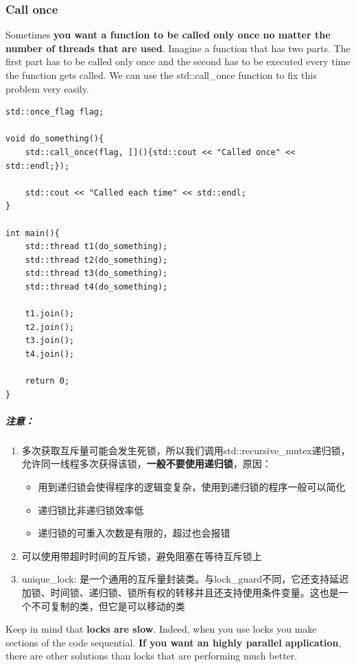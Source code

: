 \documentclass[UTF8,a4paper,12pt]{ctexbook}
\begin{document}
	\subsubsection{Call once}
		Sometimes \textbf{you want a function to be called only once no matter the number of threads that are used}. Imagine a function that has two parts. The first part has to be called only once and the second has to be executed every time the function gets called. We can use the std::call\_once function to fix this problem very easily.
		
		\begin{lstlisting}
std::once_flag flag;

void do_something(){
	std::call_once(flag, [](){std::cout << "Called once" << std::endl;});
	
	std::cout << "Called each time" << std::endl;
}

int main(){
	std::thread t1(do_something);
	std::thread t2(do_something);
	std::thread t3(do_something);
	std::thread t4(do_something);
	
	t1.join();
	t2.join();
	t3.join();
	t4.join();
	
	return 0;
}			
		\end{lstlisting}
	\subparagraph{注意：}
		\begin{enumerate}[itemindent = 1em]
			\item 多次获取互斥量可能会发生死锁，所以我们调用std::recursive\_mutex递归锁，允许同一线程多次获得该锁，\textbf{一般不要使用递归锁}，原因：
				\begin{itemize}
					\item 用到递归锁会使得程序的逻辑变复杂，使用到递归锁的程序一般可以简化
					\item 递归锁比非递归锁效率低
					\item 递归锁的可重入次数是有限的，超过也会报错
				\end{itemize}
			\item 可以使用带超时时间的互斥锁，避免阻塞在等待互斥锁上
			\item unique\_lock: 是一个通用的互斥量封装类。与lock\_guard不同，它还支持延迟加锁、时间锁、递归锁、锁所有权的转移并且还支持使用条件变量。这也是一个不可复制的类，但它是可以移动的类
		\end{enumerate}
		
		Keep in mind that \textbf{locks are slow}. Indeed, when you use locks you make sections of the code sequential. \textbf{If you want an highly parallel application}, there are other solutions than locks that are performing much better.
\end{document}
